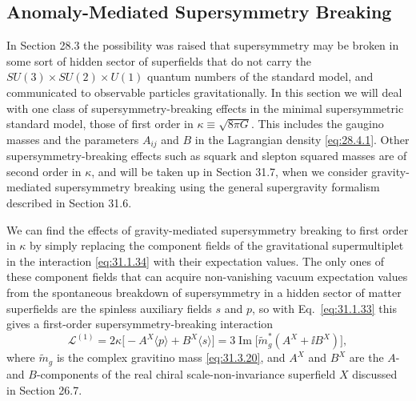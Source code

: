 
\subsection{Anomaly-Mediated Supersymmetry Breaking}

In Section 28.3 the possibility was raised that supersymmetry may be broken
in some sort of hidden sector of superfields that do not carry the
\(SU(3)\times SU(2)\times U(1)\) quantum numbers of the
standard model, and communicated to observable particles gravitationally.
In this section we will deal with one class of supersymmetry-breaking
effects in the minimal supersymmetric standard model, those of first order
in \(\kappa\equiv\sqrt{8\pi G}\). This includes the gaugino masses and the
parameters \(A_{ij}\) and \(B\) in the Lagrangian density
\eqref{eq:28.4.1}. Other supersymmetry-breaking effects such as squark and
slepton squared masses are of second order in \(\kappa\), and will be taken
up in Section 31.7, when we consider gravity-mediated supersymmetry breaking
using the general supergravity formalism described in Section 31.6.

We can find the effects of gravity-mediated supersymmetry breaking to first
order in \(\kappa\) by simply replacing the component fields of the
gravitational supermultiplet in the interaction \eqref{eq:31.1.34} with
their expectation values. The only ones of these component fields that can
acquire non-vanishing vacuum expectation values from the spontaneous
breakdown of supersymmetry in a hidden sector of matter superfields are the
spinless auxiliary fields \(s\) and \(p\), so with Eq.~\eqref{eq:31.1.33}
this gives a first-order supersymmetry-breaking interaction
\begin{equation}
  \mathcal L^{(1)}
  =2\kappa\bigl[-A^X\langle p\rangle+B^X\langle s\rangle\bigr]
  =3\operatorname{Im}
   \bigl[\widetilde m_g^*(A^X+\ii B^X)\bigr],
  \tag{31.4.1}\label{eq:31.4.1}
\end{equation}
where \(\widetilde m_g\) is the complex gravitino mass
\eqref{eq:31.3.20}, and \(A^X\) and \(B^X\) are the \(A\)- and
\(B\)-components of the real chiral scale-non-invariance superfield \(X\)
discussed in Section 26.7.


